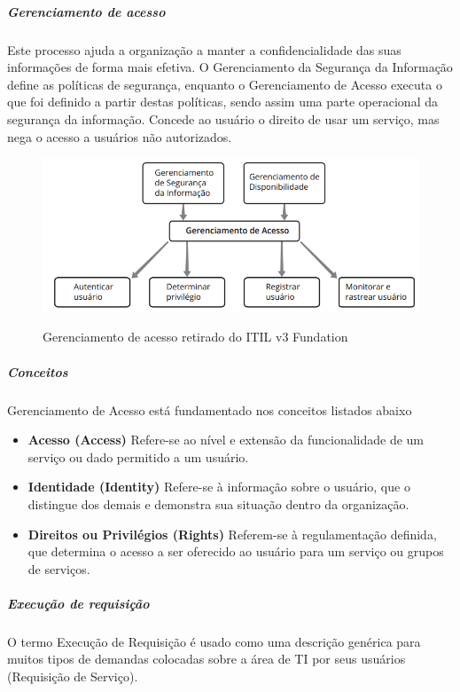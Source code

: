 \documentclass[11pt,a4paper]{article}
\begin{document}
\subparagraph{Gerenciamento de acesso}

Este processo ajuda a organização a manter a confidencialidade das suas informações de 
forma mais efetiva. O Gerenciamento da Segurança da Informação define as políticas de 
segurança, enquanto o Gerenciamento de Acesso executa o que foi definido a partir destas 
políticas, sendo assim uma parte operacional da segurança da informação.
Concede ao usuário o direito de usar um serviço, mas nega o acesso a usuários não autorizados.

\begin{figure}[!h]
\caption{Gerenciamento de acesso retirado do ITIL v3 Fundation}
\centering %
\includegraphics[width=15cm]{itil_images/gerenciamento_de_acesso.png}
\label{figura:Gerenciamento de acesso retirado do ITIL v3 Fundation}
\end{figure}

\subparagraph*{Conceitos}
Gerenciamento de Acesso está fundamentado nos conceitos listados abaixo
\begin{itemize}[noitemsep]
	\item {\bfseries Acesso (Access) } 
		Refere-se ao nível e extensão da funcionalidade de um serviço ou dado permitido a um usuário.
	\item {\bfseries Identidade (Identity) }
		Refere-se à informação sobre o usuário, que o distingue dos demais e demonstra sua situação 				dentro da organização.	
	\item {\bfseries  Direitos ou Privilégios (Rights) }
		Referem-se à regulamentação definida, que determina o acesso a ser oferecido ao usuário 
		para um serviço ou grupos de serviços.	
\end{itemize}





\subparagraph{Execução de requisição}
O termo Execução de Requisição é usado como uma descrição genérica para muitos tipos de demandas colocadas sobre a área de TI por seus usuários (Requisição de Serviço). 
\end{document}
